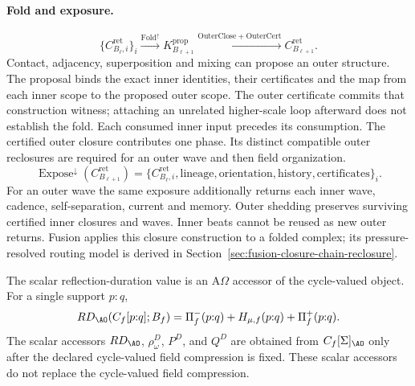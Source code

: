 \paragraph{Fold and exposure.}
\begin{equation}
\{C^{\mathrm{ret}}_{B_\ell,i}\}_i
\xrightarrow{\operatorname{Fold}^{\uparrow}}K^{\mathrm{prop}}_{B_{\ell+1}}
\xrightarrow{\mathrm{OuterClose}+\mathrm{OuterCert}}C^{\mathrm{ret}}_{B_{\ell+1}}.
\label{eq:fold-outer-closure}
\end{equation}
Contact, adjacency, superposition and mixing can propose an outer structure.
The proposal binds the exact inner identities, their certificates and the map
from each inner scope to the proposed outer scope. The outer certificate commits
that construction witness; attaching an unrelated higher-scale loop afterward
does not establish the fold. Each consumed inner input precedes its consumption.
The certified outer closure contributes one phase. Its distinct compatible
outer reclosures are required for an outer wave and then field organization.
\begin{equation}
\operatorname{Expose}^{\downarrow}(C^{\mathrm{ret}}_{B_{\ell+1}})
=\{C^{\mathrm{ret}}_{B_\ell,i},\mathrm{lineage},\mathrm{orientation},
\mathrm{history},\mathrm{certificates}\}_i.
\label{eq:expose-inner-lineage}
\end{equation}
For an outer wave the same exposure additionally returns each inner wave,
cadence, self-separation, current and memory. Outer shedding preserves
surviving certified inner closures and waves. Inner beats cannot be reused as
new outer returns. Fusion applies this closure construction to a folded
complex; its pressure-resolved routing model is derived in Section~\ref{sec:fusion-closure-chain-reclosure}.

The scalar reflection-duration value is an A\(\Omega\) accessor of the cycle-valued object. For a single support \(p{:}q\),
\begin{equation}
RD_{\AO}\!\left(C_f[p{:}q];B_f\right)
=
\Pi^-_f(p{:}q)+H_{\mu,f}(p{:}q)+\Pi^+_f(p{:}q).
\label{eq:cycle-rd-accessor}
\end{equation}
The scalar accessors \(RD_{\AO}\), \(\rho^D_\omega\), \(P^D\), and \(Q^D\) are obtained from \(C_f[\Sigma]_{\AO}\) only after the declared cycle-valued field compression is fixed. These scalar accessors do not replace the cycle-valued field compression.

